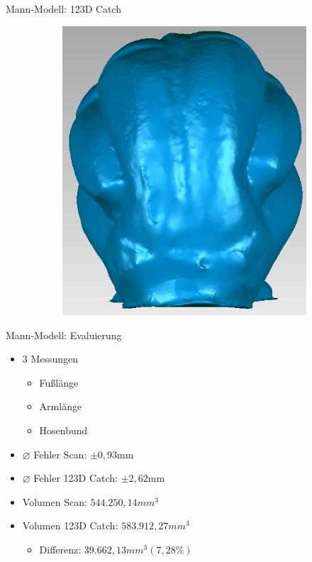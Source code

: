 \documentclass[11pt]{beamer}
\begin{document}
\begin{frame}{Mann-Modell: 123D Catch}
\begin{figure}
\begin{subfigure}{0.4\textwidth}
			\includegraphics[width=\textwidth]{images/Mann_SFM_Back}
		\end{subfigure}
	\end{figure}
\end{frame}

\begin{frame}{Mann-Modell: Evaluierung}

	\begin{itemize}
	\item 3 Messungen
		\begin{itemize}
		\item Fußlänge
		\item Armlänge
		\item Hosenbund
		\end{itemize}
	\item $\varnothing$ Fehler Scan: $\pm 0,93$mm
	\item $\varnothing$ Fehler 123D Catch: $\pm 2,62$mm
	\item Volumen Scan: $544.250,14mm^3$
	\item Volumen 123D Catch: $583.912,27mm^3$
		\begin{itemize}
		\item Differenz: $39.662,13mm^3(7,28\%)$
		\end{itemize}
	\end{itemize}
	
\end{frame}
\end{document}
